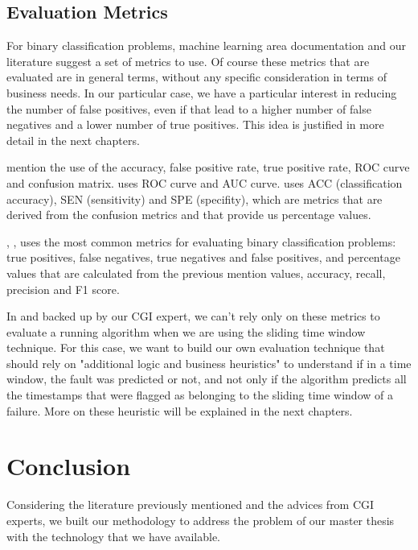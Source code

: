 \subsection{Evaluation Metrics}

For binary classification problems, machine learning area documentation and our literature suggest a set of metrics to use. Of course these metrics that are evaluated are in general terms, without any specific consideration in terms of business needs. In our particular case, we have a particular interest in reducing the number of false positives, even if that lead to a higher number of false negatives and a lower number of true positives. This idea is justified in more detail in the next chapters.

\cite{OLD_31} mention the use of the accuracy, false positive rate, true positive rate, ROC curve and confusion matrix. \cite{OLD_18_WIND} uses ROC curve and AUC curve. 
\cite{N_3_WIND} uses ACC (classification accuracy), SEN (sensitivity) and SPE (specifity), which are metrics that are derived from the confusion metrics and that provide us percentage values.

\cite{OLD_41_WIND}, \cite{ML_Alg_Analysis_2}, uses the most common metrics for evaluating binary classification problems: true positives, false negatives, true negatives and false positives, and percentage values that are calculated from the previous mention values, accuracy, recall, precision and F1 score.

In \cite{MED_1} and backed up by our CGI expert, we can't rely only on these metrics to evaluate a running algorithm when we are using the sliding time window technique. For this case, we want to build our own evaluation technique that should rely on "additional logic and business heuristics" \cite{MED_1} to understand if in a time window, the fault was predicted or not, and not only if the algorithm predicts all the timestamps that were flagged as belonging to the sliding time window of a failure. More on these heuristic will be explained in the next chapters.


\section{Conclusion} 
\label{sub:if_you_use_this_template} 

Considering the literature previously mentioned and the advices from CGI experts, we built our methodology to address the problem of our master thesis with the technology that we have available.

